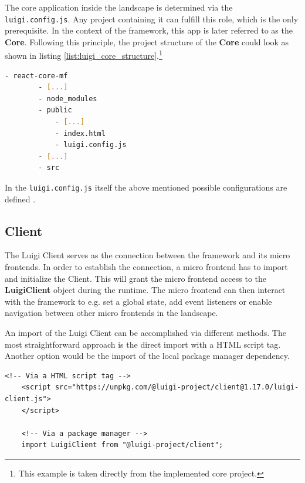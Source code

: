 The core application inside the landscape is determined via the \texttt{luigi.config.js}. Any project containing it can fulfill this role, which is the only prerequisite. In the context of the framework, this app is later referred to as the \textbf{Core}.
Following this principle, the project structure of the \textbf{Core} could look as shown in listing \ref{list:luigi_core_structure}.\footnote{This example is taken directly from the implemented core project.}

\begin{lstlisting}[language=Bash, caption=Project structure for a Luigi Core application including the \texttt{luigi.config.js} , label=list:luigi_core_structure,  xleftmargin=.0\textwidth, xrightmargin=.0\textwidth]
	- react-core-mf
		- [...]
		- node_modules
		- public
			- [...]
			- index.html
			- luigi.config.js
		- [...]
		- src
\end{lstlisting}

In the \texttt{luigi.config.js} itself the above mentioned possible configurations are defined \newline \cite{luigi_doc_core}.

\subsection{Client}

The Luigi Client serves as the connection between the framework and its micro frontends. In order to establish the connection, a micro frontend has to import and initialize the Client. This will grant the micro frontend access to the \textbf{LuigiClient} object during the runtime. The micro frontend can then interact with the framework to e.g. set a global state, add event listeners or enable navigation between other micro frontends in the landscape.

An import of the Luigi Client can be accomplished via different methods. The most straightforward approach is the direct import with a HTML script tag. Another option would be the import of the local package manager dependency.\cite{luigi_client}

\begin{lstlisting}[caption=Import methods of the Luigi Client, label=list:import_luigi_client,  xleftmargin=.0\textwidth, xrightmargin=.0\textwidth]
	<!-- Via a HTML script tag -->
	<script src="https://unpkg.com/@luigi-project/client@1.17.0/luigi-client.js">
	</script>
	
	<!-- Via a package manager -->
	import LuigiClient from "@luigi-project/client";
\end{lstlisting}

